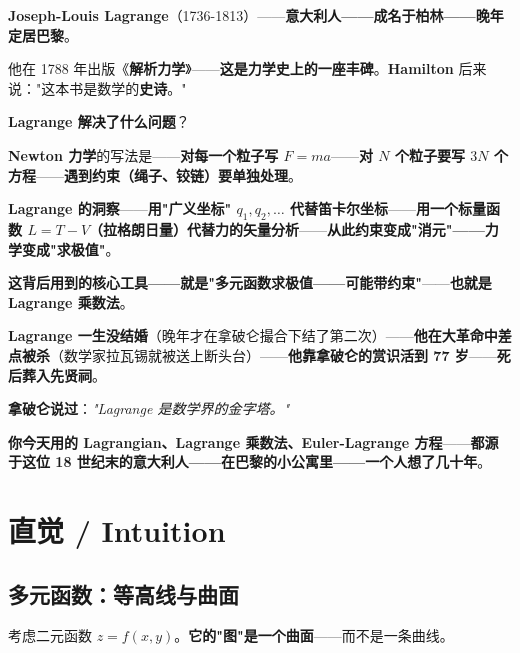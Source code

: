 \begin{tcolorbox}[storybox={\Large 小故事：Lagrange 与拿破仑时代}]
\textbf{Joseph-Louis Lagrange}（1736-1813）——\textbf{意大利人——成名于柏林——晚年定居巴黎}。

\medskip

他在 1788 年出版《\textbf{解析力学}》——\textbf{这是力学史上的一座丰碑}。\textbf{Hamilton} 后来说："这本书是数学的\textbf{史诗}。"

\medskip

\textbf{Lagrange 解决了什么问题}？

\medskip

\textbf{Newton 力学}的写法是——\textbf{对每一个粒子写 $F=ma$}——\textbf{对 $N$ 个粒子要写 $3N$ 个方程}——\textbf{遇到约束（绳子、铰链）要单独处理}。

\medskip

\textbf{Lagrange 的洞察}——\textbf{用"广义坐标" $q_1, q_2, \ldots$ 代替笛卡尔坐标}——\textbf{用一个标量函数 $L = T - V$（拉格朗日量）代替力的矢量分析}——\textbf{从此约束变成"消元"——力学变成"求极值"}。

\medskip

\textbf{这背后用到的核心工具——就是"多元函数求极值——可能带约束"}——\textbf{也就是 Lagrange 乘数法}。

\medskip

\textbf{Lagrange 一生没结婚}（晚年才在拿破仑撮合下结了第二次）——\textbf{他在大革命中差点被杀}（数学家拉瓦锡就被送上断头台）——\textbf{他靠拿破仑的赏识活到 77 岁}——\textbf{死后葬入先贤祠}。

\medskip

\textbf{拿破仑说过}：\textit{"Lagrange 是数学界的金字塔。"}

\medskip

\textbf{你今天用的 Lagrangian、Lagrange 乘数法、Euler-Lagrange 方程}——\textbf{都源于这位 18 世纪末的意大利人——在巴黎的小公寓里——一个人想了几十年}。
\end{tcolorbox}

\section{直觉 / Intuition}

\subsection{多元函数：等高线与曲面}

考虑二元函数 $z = f(x, y)$。\textbf{它的"图"是一个曲面}——而不是一条曲线。


